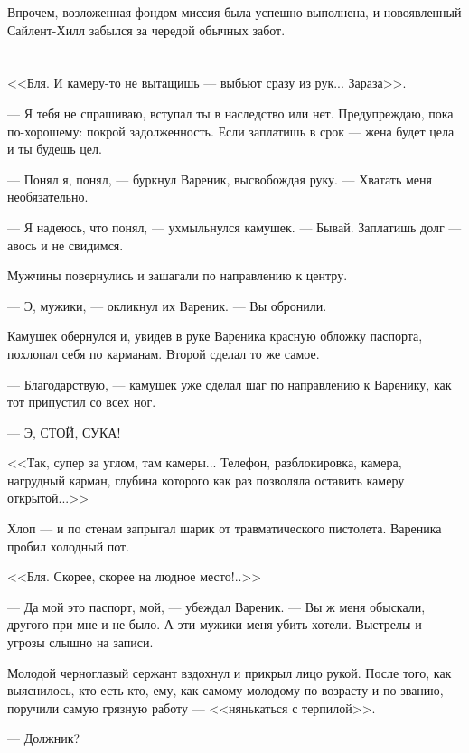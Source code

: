 Впрочем, возложенная фондом миссия была успешно выполнена, и новоявленный Сайлент-Хилл забылся за чередой обычных забот.

\chapter{}

\textspace

<<Бля.
И камеру-то не вытащишь --- выбьют сразу из рук...
Зараза>>.

--- Я тебя не спрашиваю, вступал ты в наследство или нет.
Предупреждаю, пока по-хорошему: покрой задолженность.
Если заплатишь в срок --- жена будет цела и ты будешь цел.

--- Понял я, понял, --- буркнул Вареник, высвобождая руку.
--- Хватать меня необязательно.

--- Я надеюсь, что понял, --- ухмыльнулся камушек.
--- Бывай.
Заплатишь долг --- авось и не свидимся.

Мужчины повернулись и зашагали по направлению к центру.

--- Э, мужики, --- окликнул их Вареник.
--- Вы обронили.

Камушек обернулся и, увидев в руке Вареника красную обложку паспорта, похлопал себя по карманам.
Второй сделал то же самое.

--- Благодарствую, --- камушек уже сделал шаг по направлению к Варенику, как тот припустил со всех ног.

--- Э, СТОЙ, СУКА!

<<Так, супер за углом, там камеры...
Телефон, разблокировка, камера, нагрудный карман, глубина которого как раз позволяла оставить камеру открытой...>>

Хлоп --- и по стенам запрыгал шарик от травматического пистолета.
Вареника пробил холодный пот.

<<Бля.
Скорее, скорее на людное место!..>>

\asterism

--- Да мой это паспорт, мой, --- убеждал Вареник.
--- Вы ж меня обыскали, другого при мне и не было.
А эти мужики меня убить хотели.
Выстрелы и угрозы слышно на записи.

Молодой черноглазый сержант вздохнул и прикрыл лицо рукой.
После того, как выяснилось, кто есть кто, ему, как самому молодому по возрасту и по званию, поручили самую грязную работу --- <<нянькаться с терпилой>>.

--- Должник?

